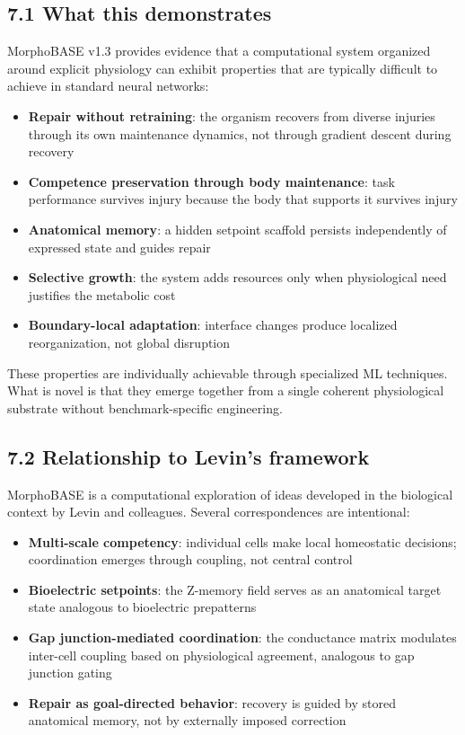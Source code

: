 \documentclass[11pt,a4paper]{article}
\begin{document}
\subsection{7.1 What this demonstrates}
MorphoBASE v1.3 provides evidence that a computational system organized around explicit physiology can exhibit properties that are typically difficult to achieve in standard neural networks:
\begin{itemize}[leftmargin=*,itemsep=3pt]
\item \textbf{Repair without retraining}: the organism recovers from diverse injuries through its own maintenance dynamics, not through gradient descent during recovery
\item \textbf{Competence preservation through body maintenance}: task performance survives injury because the body that supports it survives injury
\item \textbf{Anatomical memory}: a hidden setpoint scaffold persists independently of expressed state and guides repair
\item \textbf{Selective growth}: the system adds resources only when physiological need justifies the metabolic cost
\item \textbf{Boundary-local adaptation}: interface changes produce localized reorganization, not global disruption
\end{itemize}

These properties are individually achievable through specialized ML techniques. What is novel is that they emerge together from a single coherent physiological substrate without benchmark-specific engineering.

\subsection{7.2 Relationship to Levin's framework}
MorphoBASE is a computational exploration of ideas developed in the biological context by Levin and colleagues. Several correspondences are intentional:
\begin{itemize}[leftmargin=*,itemsep=3pt]
\item \textbf{Multi-scale competency}: individual cells make local homeostatic decisions; coordination emerges through coupling, not central control
\item \textbf{Bioelectric setpoints}: the Z-memory field serves as an anatomical target state analogous to bioelectric prepatterns
\item \textbf{Gap junction-mediated coordination}: the conductance matrix modulates inter-cell coupling based on physiological agreement, analogous to gap junction gating
\item \textbf{Repair as goal-directed behavior}: recovery is guided by stored anatomical memory, not by externally imposed correction
\end{itemize}
\end{document}
